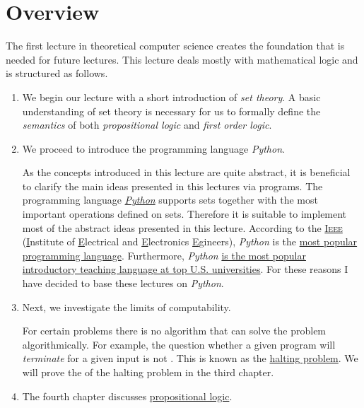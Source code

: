 \section{Overview} 
The first lecture in theoretical computer science creates the foundation that is needed for future lectures.
This lecture deals mostly with mathematical logic and is structured as follows.
\begin{enumerate}
\item We begin our lecture with a short introduction of \emph{set theory}.  A basic understanding of set theory is
      necessary for us to formally define the \emph{semantics} of both \emph{propositional logic} and \emph{first order logic}.
\item We proceed to introduce the programming language \textsl{Python}.

      As the concepts introduced in this lecture are quite abstract, it is beneficial to clarify the main
      ideas presented in this lectures via programs.  The programming language
      \href{http://python.org}{\textsl{Python}} supports sets together with the most important operations
      defined on sets.  Therefore it is
      suitable to implement most of the abstract ideas presented in this lecture.  According to the 
      \href{http://ieee.org}{\textsc{Ieee}} (\underline{I}nstitute of \underline{E}lectrical and
      \underline{E}lectronics \underline{E}gineers),  \textsl{Python} is the 
      \href{https://spectrum.ieee.org/static/interactive-the-top-programming-languages-2019}{most popular programming language}.
      Furthermore, \textsl{Python}
      \href{https://cacm.acm.org/blogs/blog-cacm/176450-python-is-now-the-most-popular-introductory-teaching-language-at-top-u-s-universities/fulltext}{is
      the most popular introductory teaching language at top U.S. universities}.   For these reasons I
      have decided to base these lectures on \textsl{Python}.

\item Next, we investigate the limits of computability.

      For certain problems there is no algorithm that can solve the problem algorithmically. 
      For example, the question whether a given program will \emph{terminate} for a given input is not
      .  This is known as the \href{https://en.wikipedia.org/wiki/Halting_problem}{halting problem}.  
      We will prove the  of the halting problem in the third chapter. 
\item The fourth chapter discusses \href{https://en.wikipedia.org/wiki/Propositional_calculus}{propositional logic}.


\end{enumerate}
